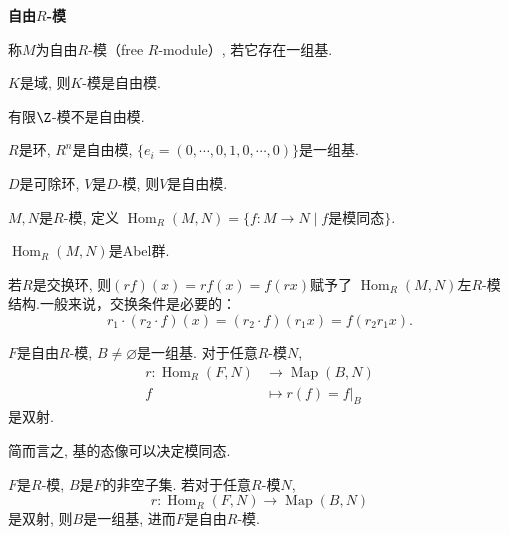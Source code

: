 	\begin{definition} \textbf{自由$R$-模}\par
		称$M$为自由$R$-模（free $R$-module）, 若它存在一组基.
	\end{definition}
	
	\begin{example}
		$K$是域, 则$K$-模是自由模.
	\end{example}
	
	\begin{example}
		有限$\Z$-模不是自由模.
	\end{example}
	
	\begin{example}
		$R$是环, $R^n$是自由模, $\{e_i=(0,\cdots,0,1,0,\cdots,0)\}$是一组基.
	\end{example}	
	
	\begin{exercise}
		$D$是可除环, $V$是$D$-模, 则$V$是自由模.
	\end{exercise}
	
	\begin{definition}
		$M,N$是$R$-模, 定义
        $\operatorname{Hom}_R(M,N)=\{f:M\rightarrow N\mid f$是模同态$\}$.
	\end{definition}
	
	\begin{proposition} $\operatorname{Hom}_R(M,N)$是Abel群.\par
        \qquad 若$R$是交换环, 则$(rf)(x)=rf(x)=f(rx)$赋予了
        $\operatorname{Hom}_R(M,N)$左$R$-模结构.一般来说，交换条件是必要的：
        $$r_1\cdot(r_2\cdot f)(x)=(r_2\cdot f)(r_1x)=f(r_2r_1x).$$
    	\end{proposition}
	
	\begin{proposition}
		$F$是自由$R$-模, $B\neq \varnothing$是一组基. 对于任意$R$-模$N$, 
			\begin{align*}
			r: \operatorname{Hom}_R(F,N)&\rightarrow \operatorname{Map}(B,N)\\
			 f&\mapsto r(f)=f|_{B}
			\end{align*}
	是双射.\par
        \qquad 简而言之, 基的态像可以决定模同态.
	\end{proposition}
	
	\begin{proposition}
		$F$是$R$-模, $B$是$F$的非空子集. 若对于任意$R$-模$N$,
			$$r: \operatorname{Hom}_R(F,N)\rightarrow \operatorname{Map}(B,N)$$
	是双射, 则$B$是一组基, 进而$F$是自由$R$-模.
	\end{proposition}
	
